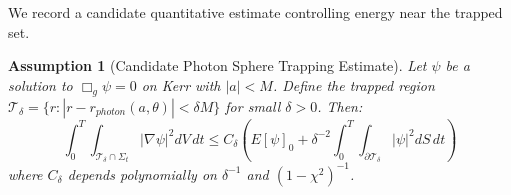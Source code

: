 \documentclass[12pt,a4paper]{article}
\newtheorem{assumption}[theorem]{Assumption}
\begin{document}
We record a candidate quantitative estimate controlling energy near the trapped set.

\begin{assumption}[Candidate Photon Sphere Trapping Estimate]\label{thm:trapping-estimate}
Let $\psi$ be a solution to $\Box_g \psi = 0$ on Kerr with $|a| < M$. Define the trapped region $\mathcal{T}_\delta = \{r: |r - r_{photon}(a, \theta)| < \delta M\}$ for small $\delta > 0$. Then:
\begin{equation}
\int_0^T \int_{\mathcal{T}_\delta \cap \Sigma_t} |\nabla\psi|^2 dV\, dt \leq C_\delta \left(E[\psi]_0 + \delta^{-2}\int_0^T \int_{\partial\mathcal{T}_\delta} |\psi|^2 dS\, dt\right)
\end{equation}
where $C_\delta$ depends polynomially on $\delta^{-1}$ and $(1-\chi^2)^{-1}$.
\end{assumption}
\end{document}
